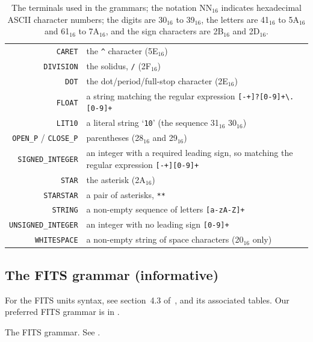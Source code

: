 \documentclass[11pt,notitlepage,onecolumn]{ivoa}
\newcommand*\hex[1]{\uppercase{#1}${}_{16}$}
\begin{document}
\begin{table}[ht]
\begin{tabular}{rL{9cm}}
\texttt{CARET}&the \texttt{\^{}} character (\hex{5e})\\
\texttt{DIVISION}&the solidus, \texttt{/} (\hex{2f})\\
\texttt{DOT}&the dot/period/full-stop character (\hex{2e})\\
\texttt{FLOAT}&a string matching the regular expression
       \texttt{[-+]?[0-9]+\textbackslash.[0-9]+}\\
\texttt{LIT10}&a literal string `\texttt{10}' (the sequence \hex{31} \hex{30})\\
\texttt{OPEN\_P} / \texttt{CLOSE\_P}&parentheses (\hex{28} and \hex{29})\\
\texttt{SIGNED\_INTEGER}&an integer with a required leading sign, so
matching the regular expression \texttt{[-+][0-9]+}\\
\texttt{STAR}&the asterisk (\hex{2a})\\
\texttt{STARSTAR}&a pair of asterisks, \texttt{**}\\
\texttt{STRING}&a non-empty sequence of letters \texttt{[a-zA-Z]+}\\
\texttt{UNSIGNED\_INTEGER}&an integer with no leading sign \texttt{[0-9]+}\\
\texttt{WHITESPACE}&a non-empty string of space characters (\hex{20} only)\\
\end{tabular}
\caption[The terminals used in the grammars]
{\label{tabx:terminals}The terminals used in the grammars; the
notation \hex{nn} indicates hexadecimal ASCII character numbers;
the digits are \hex{30} to \hex{39}, the letters are \hex{41} to \hex{5a} and \hex{61} to
\hex{7a}, and the sign characters are \hex{2b} and \hex{2d}.}
\end{table}

\subsection{The FITS grammar (informative)}
\label{appx:fitsgrammar}

For the FITS units syntax, see section~4.3 of~\cite{pence10}, and its
associated tables.  Our preferred FITS grammar is in
.

\begin{table}[ht]

\caption[The FITS grammar]{\label{tabx:fitsgrammar}The FITS grammar.
See .}
\end{table}
\end{document}
